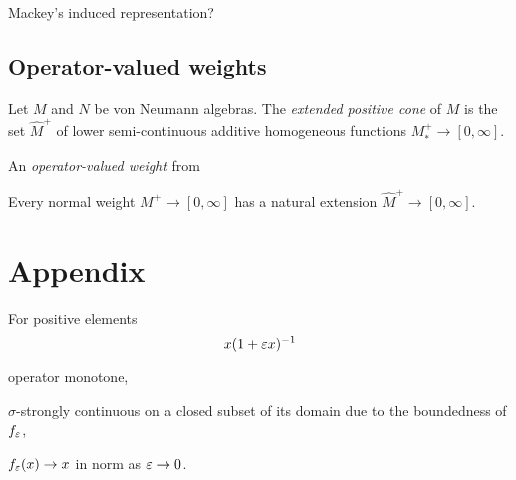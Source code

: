 \documentclass{../../../small}
\begin{document}
Mackey's induced representation?







\subsection{Operator-valued weights}


\begin{defn}
Let $M$ and $N$ be von Neumann algebras.
The \emph{extended positive cone} of $M$ is the set $\hat M^+$ of lower semi-continuous additive homogeneous functions $M_*^+\to[0,\infty]$.

An \emph{operator-valued weight} from 
\end{defn}
Every normal weight $M^+\to[0,\infty]$ has a natural extension $\hat M^+\to[0,\infty]$.









\newpage
\section*{Appendix}

\begin{prop}
For positive elements
\[x(1+\varepsilon x)^{-1}\]
\begin{parts}
\item operator monotone,
\item $\sigma$-strongly continuous on a closed subset of its domain due to the boundedness of $f_\varepsilon$,
\item $f_\varepsilon(x)\to x$ in norm as $\varepsilon\to0$.
\end{parts}
\end{prop}
\end{document}
